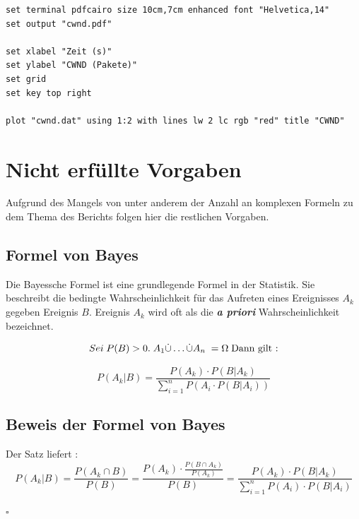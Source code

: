 \documentclass[paper=a4,fontsize=12pt,ngerman]{scrartcl}
\begin{document}
\begin{verbatim}
set terminal pdfcairo size 10cm,7cm enhanced font "Helvetica,14"
set output "cwnd.pdf"

set xlabel "Zeit (s)"
set ylabel "CWND (Pakete)"
set grid
set key top right

plot "cwnd.dat" using 1:2 with lines lw 2 lc rgb "red" title "CWND"
\end{verbatim}


\section{Nicht erfüllte Vorgaben}
Aufgrund des Mangels von unter anderem der Anzahl an komplexen Formeln zu dem Thema des Berichts folgen hier die 
restlichen Vorgaben.

\subsection{Formel von Bayes}
Die Bayessche Formel ist eine grundlegende Formel in der Statistik. Sie beschreibt die bedingte Wahrscheinlichkeit für
das Aufreten eines Ereignisses $A_k$ gegeben Ereignis $B$. 
Ereignis $A_k$ wird oft als die \textbf{\textit{a priori}} Wahrscheinlichkeit bezeichnet.

\[
Sei \; P(B)>0. \; A_1 \dot{\cup} \ldots \dot{\cup} A_n \;  =\Omega \; \text{Dann gilt :} \newline
\]

\[
P(A_k | B) = \frac{P(A_k)  \cdot P(B | A_k)}{\sum_{i=1}^{n}P(A_i  \cdot P(B | A_i))}
\]

\subsection{Beweis der Formel von Bayes}

Der Satz liefert : 
\[ 
P(A_k | B) = \frac{P(A_k \cap B)}{P(B)} = \frac{P(A_k) \cdot \frac{P(B \cap A_k)}{P(A_k)}} {P(B)} = \frac{P(A_k) \cdot P(B | A_k)}{ \sum_{i=1}^{n}P(A_i) \cdot P(B | A_i)}
\]

$\square$
\end{document}
